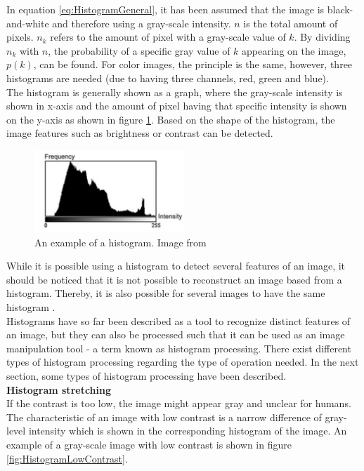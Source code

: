 In equation \ref{eq:HistogramGeneral}, it has been assumed that the image is black-and-white and therefore using a gray-scale intensity. $n$ is the total amount of pixels. $n_k$ refers to the amount of pixel with a gray-scale value of $k$. By dividing $n_k$ with $n$, the probability of a specific gray value of $k$ appearing on the image, $p(k)$, can be found. For color images, the principle is the same, however, three histograms are needed (due to having three channels, red, green and blue). \\

The histogram is generally shown as a graph, where the gray-scale intensity is shown in x-axis and the amount of pixel having that specific intensity is shown on the y-axis as shown in figure \ref{fig:HistogramEx}. Based on the shape of the histogram, the image features such as brightness or contrast can be detected. \\

\begin{figure}[H]
	\centering
	\includegraphics[width=0.5\textwidth]{8Misc/Pictures/Introduction/histogram_example.jpg}
	\caption{An example of a histogram. Image from \citep[ Chapter~4.3]{book:Moeslund}}
	\label{fig:HistogramEx}
\end{figure}

While it is possible using a histogram to detect several features of an image, it should be noticed that it is not possible to reconstruct an image based from a histogram. Thereby, it is also possible for several images to have the same histogram \citep{book:Moeslund}. \\

Histograms have so far been described as a tool to recognize distinct features of an image, but they can also be processed such that it can be used as an image manipulation tool - a term known as histogram processing. There exist different types of histogram processing regarding the type of operation needed. In the next section, some types of histogram processing have been described. \\

\textbf{Histogram stretching} \\
If the contrast is too low, the image might appear gray and unclear for humans. The characteristic of an image with low contrast is a narrow difference of gray-level intensity which is shown in the corresponding histogram of the image. An example of a gray-scale image with low contrast is shown in figure \ref{fig:HistogramLowContrast}. 

